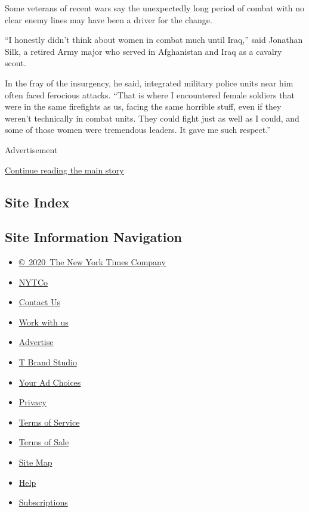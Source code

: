 Some veterans of recent wars say the unexpectedly long period of combat
with no clear enemy lines may have been a driver for the change.

``I honestly didn't think about women in combat much until Iraq,'' said
Jonathan Silk, a retired Army major who served in Afghanistan and Iraq
as a cavalry scout.

In the fray of the insurgency, he said, integrated military police units
near him often faced ferocious attacks. ``That is where I encountered
female soldiers that were in the same firefights as us, facing the same
horrible stuff, even if they weren't technically in combat units. They
could fight just as well as I could, and some of those women were
tremendous leaders. It gave me such respect.''

Advertisement

\protect\hyperlink{after-bottom}{Continue reading the main story}

\hypertarget{site-index}{%
\subsection{Site Index}\label{site-index}}

\hypertarget{site-information-navigation}{%
\subsection{Site Information
Navigation}\label{site-information-navigation}}

\begin{itemize}
\tightlist
\item
  \href{https://help.nytimes.com/hc/en-us/articles/115014792127-Copyright-notice}{©~2020~The
  New York Times Company}
\end{itemize}

\begin{itemize}
\tightlist
\item
  \href{https://www.nytco.com/}{NYTCo}
\item
  \href{https://help.nytimes.com/hc/en-us/articles/115015385887-Contact-Us}{Contact
  Us}
\item
  \href{https://www.nytco.com/careers/}{Work with us}
\item
  \href{https://nytmediakit.com/}{Advertise}
\item
  \href{http://www.tbrandstudio.com/}{T Brand Studio}
\item
  \href{https://www.nytimes.com/privacy/cookie-policy\#how-do-i-manage-trackers}{Your
  Ad Choices}
\item
  \href{https://www.nytimes.com/privacy}{Privacy}
\item
  \href{https://help.nytimes.com/hc/en-us/articles/115014893428-Terms-of-service}{Terms
  of Service}
\item
  \href{https://help.nytimes.com/hc/en-us/articles/115014893968-Terms-of-sale}{Terms
  of Sale}
\item
  \href{https://spiderbites.nytimes.com}{Site Map}
\item
  \href{https://help.nytimes.com/hc/en-us}{Help}
\item
  \href{https://www.nytimes.com/subscription?campaignId=37WXW}{Subscriptions}
\end{itemize}
